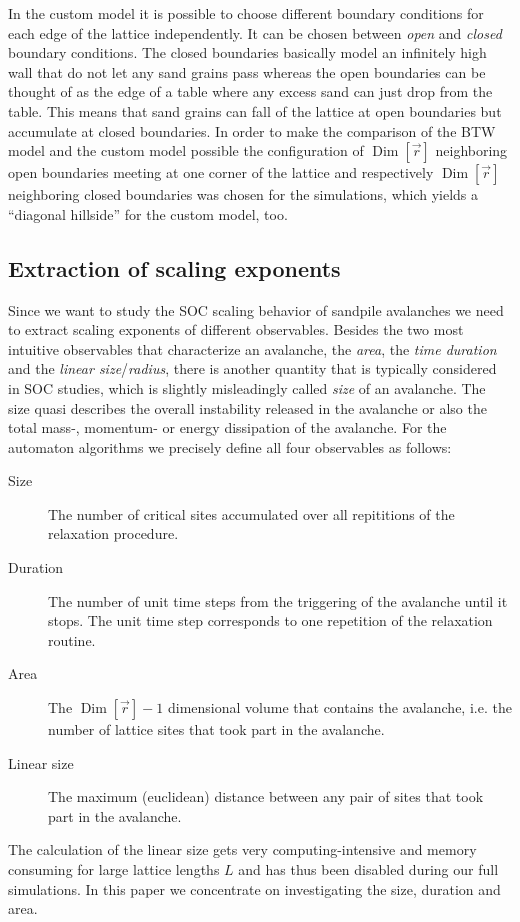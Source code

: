 In the custom model it is possible to choose different boundary conditions for each edge of the lattice independently.
It can be chosen between \emph{open} and \emph{closed} boundary conditions. The closed boundaries basically model an
infinitely high wall that do not let any sand grains pass whereas the open boundaries can be thought of as the edge of
a table where any excess sand can just drop from the table. This means that sand grains can fall of the lattice at
open boundaries but accumulate at closed boundaries.
In order to make the comparison of the BTW model and the custom model possible the configuration of
$\operatorname{Dim}\left[\vec{r}\right]$ neighboring open boundaries meeting at one corner of the lattice and
respectively $\operatorname{Dim}\left[\vec{r}\right]$ neighboring closed boundaries was chosen for the simulations,
which yields a \enquote{diagonal hillside} for the custom model, too.

\subsection{Extraction of scaling exponents}
\label{sec:extractCritExp}
Since we want to study the SOC scaling behavior of sandpile avalanches we need to extract scaling exponents of
different observables. Besides the two most intuitive observables that characterize an avalanche, the \emph{area},
the \emph{time duration} and the \emph{linear size}/\emph{radius}, there is another quantity that is typically considered
in SOC studies, which is slightly misleadingly called \emph{size} of an avalanche. The size quasi describes the overall
instability released in the avalanche or also the total mass-, momentum- or energy dissipation of the avalanche.
For the automaton algorithms we precisely define all four observables as follows:
\begin{description}
\item[Size] The number of critical sites accumulated over all repititions of the relaxation procedure.
\item[Duration] The number of unit time steps from the triggering of the avalanche until it stops. The unit time step
                corresponds to one repetition of the relaxation routine.
\item[Area] The $\operatorname{Dim}\left[\vec{r}\right]-1$ dimensional volume that contains the avalanche,
            i.e. the number of lattice sites that took part in the avalanche.
\item[Linear size] The maximum (euclidean) distance between any pair of sites that took part in the avalanche.
\end{description}
The calculation of the linear size gets very computing-intensive and memory consuming for large
lattice lengths $L$ and has thus been disabled during our full simulations. In this paper we concentrate
on investigating the size, duration and area.


